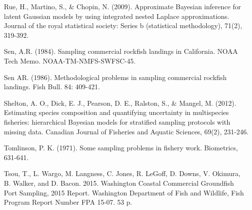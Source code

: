 \documentclass[12pt]{article}
\begin{document}
\begin{thebibliography}{1}
%
 Rue, H., Martino, S., \& Chopin, N. (2009). Approximate 
Bayesian inference for latent Gaussian models by using integrated nested 
Laplace approximations. Journal of the royal statistical society: 
Series b (statistical methodology), 71(2), 319-392.

%
 Sen, A.R. (1984). Sampling commercial rockfish landings in 
California. NOAA Tech Memo. NOAA-TM-NMFS-SWFSC-45.

%
 Sen AR. (1986). Methodological problems in sampling 
commercial rockfish landings. Fish Bull. 84: 409-421.

%
 Shelton, A. O., Dick, E. J., Pearson, D. E., Ralston, 
S., \& Mangel, M. (2012). Estimating species composition and quantifying 
uncertainty in multispecies fisheries: hierarchical Bayesian models for 
stratified sampling protocols with missing data. Canadian Journal of Fisheries 
and Aquatic Sciences, 69(2), 231-246.

%
 Tomlinson, P. K. (1971). Some sampling problems in 
fishery work. Biometrics, 631-641.

%
 Tsou, T., L. Wargo, M. Langness, C. Jones, R. LeGoff, D. 
Downs, V. Okimura, B. Walker, and D. Bacon. 2015. Washington Coastal 
Commercial Groundfish Port Sampling, 2015 Report. Washington Department of 
Fish and Wildlife, Fish Program Report Number FPA 15-07. 53 p.

\end{thebibliography}

%
\end{document}
